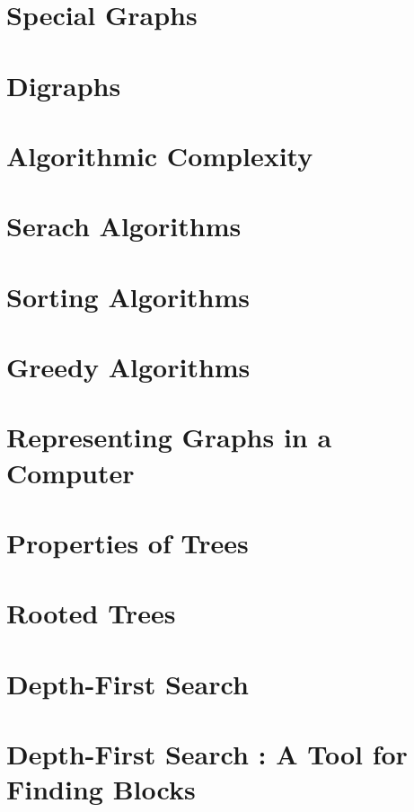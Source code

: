 \section{Special Graphs}
\section{Digraphs}

\section{Algorithmic Complexity}
\section{Serach Algorithms}
\section{Sorting Algorithms}
\setcounter{section}{4}
\section{Greedy Algorithms}
\section{Representing Graphs in a Computer}

\section{Properties of Trees}
\section{Rooted Trees}
\section{Depth-First Search}
\section{Depth-First Search : A Tool for Finding Blocks}

